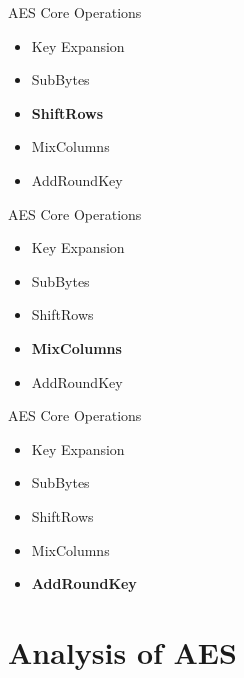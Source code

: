 \documentclass[aspectratio=169,24pt]{beamer}
\begin{document}
\begin{frame}{AES Core Operations}
	\begin{wide}
    \begin{itemize}
        \item Key Expansion
        \item SubBytes
        \item \textcolor{buetAccent}{\textbf{ShiftRows}}
        \item MixColumns
        \item AddRoundKey
    \end{itemize}
	\end{wide}
\end{frame}

\begin{frame}{AES Core Operations}
	\begin{wide}
    \begin{itemize}
        \item Key Expansion
        \item SubBytes
        \item ShiftRows
        \item \textcolor{buetAccent}{\textbf{MixColumns}}
        \item AddRoundKey
    \end{itemize}
	\end{wide}
\end{frame}

\begin{frame}{AES Core Operations}
	\begin{wide}
    \begin{itemize}
        \item Key Expansion
        \item SubBytes
        \item ShiftRows
        \item MixColumns
        \item \textcolor{buetAccent}{\textbf{AddRoundKey}}
    \end{itemize}
	\end{wide}
\end{frame}

\section{Analysis of AES}
\end{document}
